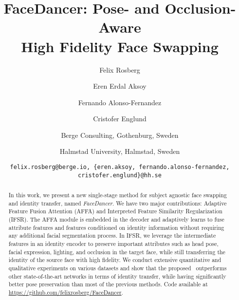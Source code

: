 \documentclass[10pt,twocolumn,letterpaper]{article}
\newcommand{\ft}[1]{FaceDancer{#1}}
\newcommand{\fti}[1]{\textit{FaceDancer}{#1}}
\begin{document}
\title{FaceDancer: Pose- and Occlusion-Aware\\ High Fidelity Face Swapping}

\author{Felix Rosberg
\and
Eren Erdal Aksoy
\and
Fernando Alonso-Fernandez
\and
Cristofer Englund
\and
\small Berge Consulting, Gothenburg, Sweden
\and
\small Halmstad University, Halmstad, Sweden
\and
{\tt\small felix.rosberg@berge.io, \{eren.aksoy, fernando.alonso-fernandez, cristofer.englund\}@hh.se}
}






\twocolumn[{\renewcommand\twocolumn[1][]{#1}\maketitle
\begin{center}
   \centering
    \captionsetup{type=figure}
    \texttt{[image: images/headerfig\_v3.png]}
    \captionof{figure}{Face swapping results generated by \ft.}
    \label{fig:best_results}
\end{center}}]


\thispagestyle{empty}




\begin{abstract}
In this work, we present a new  single-stage method  for subject agnostic face swapping and identity transfer, named \fti. 
We have two major contributions: Adaptive Feature Fusion Attention (AFFA) and Interpreted Feature Similarity Regularization (IFSR). 
The AFFA module is embedded in the decoder and adaptively learns to fuse attribute features and features conditioned on identity information without requiring any additional facial segmentation process.  
In IFSR, we leverage  the intermediate features in an identity encoder  to preserve important attributes such as head pose, facial expression, lighting, and occlusion in the target face, while still transferring the identity of the source face with high fidelity.
We conduct extensive quantitative and qualitative experiments on various datasets and show that the proposed \fti~outperforms other state-of-the-art networks in terms of identity transfer, while having significantly better pose preservation than most of the previous  methods. Code available at \url{https://github.com/felixrosberg/FaceDancer}.
\end{abstract}
\end{document}

